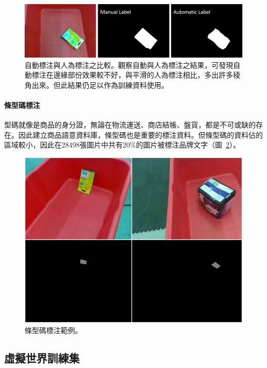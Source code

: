 \begin{figure}[H]
	\centering
	\includegraphics[height=!, width=1.0\linewidth, keepaspectratio=true]
	{./figures/auto_object_label.png}
  \caption{自動標注與人為標注之比較。觀察自動與人為標注之結果，可發現自動標注在邊緣部份效果較不好，與平滑的人為標注相比，多出許多稜角出來。但此結果仍足以作為訓練資料使用。}
  \label{figure:auto_object_label}
\end{figure}

\paragraph{條型碼標注}
型碼就像是商品的身分證，無論在物流運送、商店結帳、盤貨，都是不可或缺的存在。因此建立商品語意資料庫，條型碼也是重要的標注資料。但條型碼的資料佔的區域較小，因此在28498張圖片中共有20\%的圖片被標注品牌文字（圖~\ref{figure:barcode_label_example}）。

\begin{figure}[H]
	\centering
	\includegraphics[height=!, width=0.8\linewidth, keepaspectratio=true]
	{./figures/barcode_label_example.jpg}
  \caption{條型碼標注範例。}
  \label{figure:barcode_label_example}
\end{figure}

\subsection{虛擬世界訓練集}
